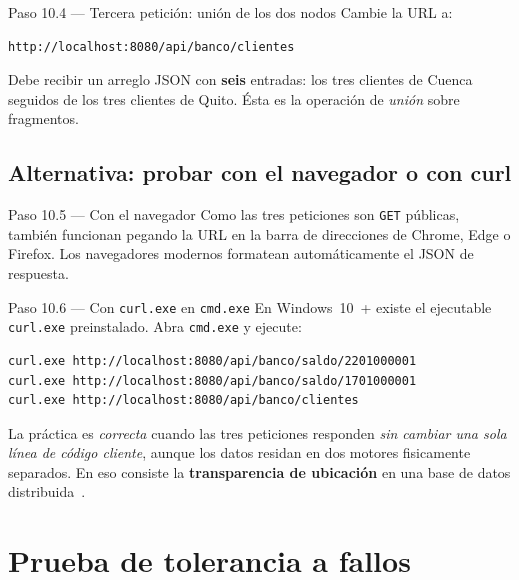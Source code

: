 \documentclass[11pt,a4paper]{article}
\begin{document}
\begin{pasobox}{Paso 10.4 --- Tercera petici\'on: uni\'on de los dos nodos}
Cambie la URL a:

\begin{lstlisting}[style=plainstyle]
http://localhost:8080/api/banco/clientes
\end{lstlisting}

Debe recibir un arreglo JSON con \textbf{seis} entradas: los tres clientes de Cuenca seguidos de los tres clientes de Quito. \'Esta es la operaci\'on de \emph{uni\'on} sobre fragmentos.
\end{pasobox}

\subsection{Alternativa: probar con el navegador o con curl}

\begin{pasobox}{Paso 10.5 --- Con el navegador}
Como las tres peticiones son \texttt{GET} p\'ublicas, tambi\'en funcionan pegando la URL en la barra de direcciones de Chrome, Edge o Firefox. Los navegadores modernos formatean autom\'aticamente el JSON de respuesta.
\end{pasobox}

\begin{pasobox}{Paso 10.6 --- Con \texttt{curl.exe} en \texttt{cmd.exe}}
En Windows~10~+ existe el ejecutable \texttt{curl.exe} preinstalado. Abra \texttt{cmd.exe} y ejecute:

\begin{lstlisting}[style=bashstyle]
curl.exe http://localhost:8080/api/banco/saldo/2201000001
curl.exe http://localhost:8080/api/banco/saldo/1701000001
curl.exe http://localhost:8080/api/banco/clientes
\end{lstlisting}
\end{pasobox}

\begin{verifbox}
La pr\'actica es \emph{correcta} cuando las tres peticiones responden \emph{sin cambiar una sola l\'inea de c\'odigo cliente}, aunque los datos residan en dos motores fisicamente separados. En eso consiste la \textbf{transparencia de ubicaci\'on} en una base de datos distribuida~\cite[cap.~1]{Ozsu2020Principles}.
\end{verifbox}

\clearpage
\section{Prueba de tolerancia a fallos}
\end{document}
